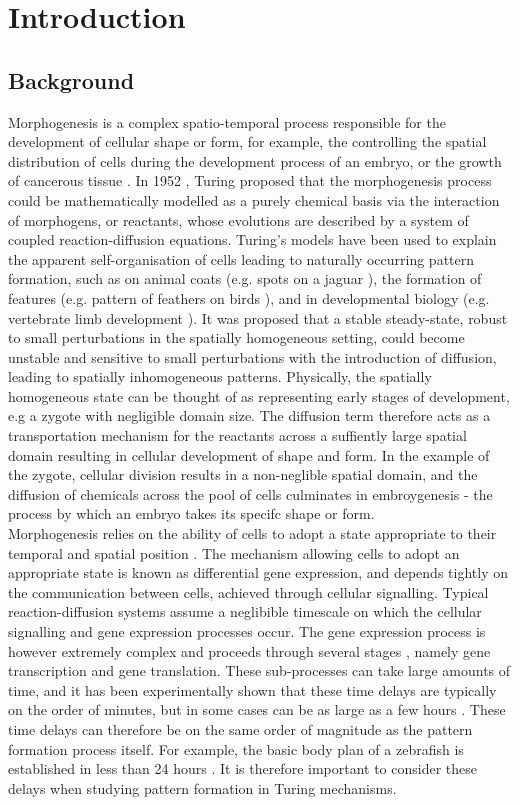 \chapter{Introduction}

\section{Background}

Morphogenesis is a complex spatio-temporal process responsible for the development of cellular shape or form, for example, the controlling the spatial distribution of cells during the development process of an embryo, or the growth of cancerous tissue \cite{morph}. In 1952 \cite{turing}, Turing proposed that the morphogenesis process could be mathematically modelled as a purely chemical basis via the interaction of morphogens, or reactants, whose evolutions are described by a system of coupled reaction-diffusion equations. Turing's models have been used to explain the apparent self-organisation of cells leading to naturally occurring pattern formation, such as on animal coats (e.g. spots on a jaguar \cite{painter}), the formation of features (e.g. pattern of feathers on birds \cite{bailleul}), and in developmental biology (e.g. vertebrate limb development \cite{miura1,glimm,miura2}). It was proposed that a stable steady-state, robust to small perturbations in the spatially homogeneous setting, could become unstable and sensitive to small perturbations with the introduction of diffusion, leading to spatially inhomogeneous patterns. Physically, the spatially homogeneous state can be thought of as representing early stages of development, e.g a zygote with negligible domain size. The diffusion term therefore acts as a transportation mechanism for the reactants across a suffiently large spatial domain resulting in cellular development of shape and form. In the example of the zygote, cellular division results in a non-neglible spatial domain, and the diffusion of chemicals across the pool of cells culminates in embroygenesis - the process by which an embryo takes its specifc shape or form.
\\
Morphogenesis relies on the ability of cells to adopt a state appropriate to their temporal and spatial position \cite{gaffmonk}. The mechanism allowing cells to adopt an appropriate state is known as differential gene expression, and depends tightly on the communication between cells, achieved through cellular signalling. Typical reaction-diffusion systems assume a neglibible timescale on which the cellular signalling and gene expression processes occur. The gene expression process is however extremely complex and proceeds through several stages \cite{gaffmonk}, namely gene transcription and gene translation. These sub-processes can take large amounts of time, and it has been experimentally shown that these time delays are typically on the order of minutes, but in some cases can be as large as a few hours \cite{gaffmonk,tennyson}. These time delays can therefore be on the same order of magnitude as the pattern formation process itself. For example, the basic body plan of a zebrafish is established in less than 24 hours \cite{gaffmonk,kimmel}. It is therefore important to consider these delays when studying pattern formation in Turing mechanisms.
